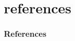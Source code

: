 %
%

\section{references}
\begin{frame}[allowframebreaks,t]
  \frametitle{References}
  
  {\footnotesize }
\end{frame}

